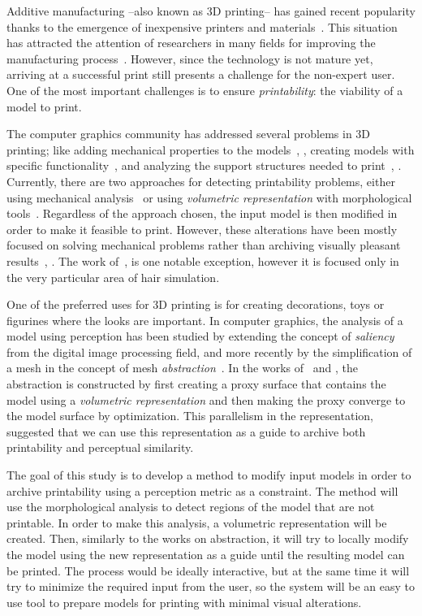 Additive manufacturing --also known as 3D printing-- has gained recent popularity thanks to the emergence of inexpensive printers and materials~\cite{Oropallo2015}. This situation has attracted the attention of researchers in many fields for improving the manufacturing process~\cite{Gao2015}. However, since the technology is not mature yet, arriving at a successful print still presents a challenge for the non-expert user. One of the most important challenges is to ensure \emph{printability}: the viability of a model to print.

The computer graphics community has addressed several problems in 3D printing; like adding mechanical properties to the models~\cite{Li2015}, \cite{Panetta2015}, creating models with specific functionality~\cite{Song2015}, \cite{Bacher2014} and analyzing the support structures needed to print~\cite{Vanek2014}, \cite{Hu2016}. Currently, there are two approaches for detecting printability problems, either using mechanical analysis~\cite{Stava2012} or using \emph{volumetric representation} with morphological tools~\cite{Telea2011}. Regardless of the approach chosen, the input model is then modified in order to make it feasible to print. However, these alterations have been mostly focused on solving mechanical problems rather than archiving visually pleasant results~\cite{Lu2014}, \cite{Zhou2013}. The work of~\cite{Echevarria2014}, is one notable exception, however it is focused only in the very particular area of hair simulation.

One of the preferred uses for 3D printing is for creating decorations, toys or figurines where the looks are important. In computer graphics, the analysis of a model using perception has been studied by extending the concept of \emph{saliency}~\cite{Wang2015} from the digital image processing field, and more recently by the simplification of a mesh in the concept of mesh \emph{abstraction}~\cite{DeGoes2011}. In the works of~\cite{Mehra2009} and \cite{Yumer2012}, the abstraction is constructed by first creating a proxy surface that contains the model using a \emph{volumetric representation} and then making the proxy converge to the model surface by optimization. This parallelism in the representation, suggested that we can use this representation as a guide to archive both printability and perceptual similarity.

The goal of this study is to develop a method to modify input models in order to archive printability using a perception metric as a constraint. The method will use the morphological analysis to detect regions of the model that are not printable. In order to make this analysis, a volumetric representation will be created. Then, similarly to the works on abstraction, it will try to locally modify the model using the new representation as a guide until the resulting model can be printed. The process would be ideally interactive, but at the same time it will try to minimize the required input from the user, so the system will be an easy to use tool to prepare models for printing with minimal visual alterations.
